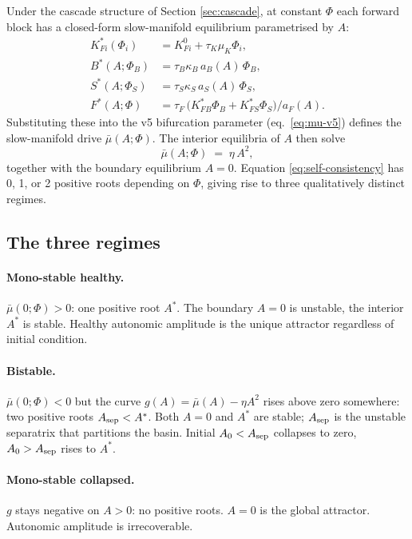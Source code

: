 \documentclass[11pt,a4paper]{article}
\theoremstyle{definition}
\begin{document}
Under the cascade structure of Section \ref{sec:cascade}, at constant
$\Phi$ each forward block has a closed-form slow-manifold equilibrium
parametrised by $A$:
\begin{align}
K_{Fi}^*(\Phi_i)   &= K_{Fi}^0 + \tau_K \mu_K \Phi_i, \\
B^*(A; \Phi_B)     &= \tau_B \kappa_B \, a_B(A) \, \Phi_B, \\
S^*(A; \Phi_S)     &= \tau_S \kappa_S \, a_S(A) \, \Phi_S, \\
F^*(A; \Phi)       &= \tau_F \, \big(K_{FB}^* \Phi_B + K_{FS}^* \Phi_S\big) / a_F(A).
\end{align}
Substituting these into the v5 bifurcation parameter (eq.\
\ref{eq:mu-v5}) defines the slow-manifold drive $\bar\mu(A; \Phi)$.
The interior equilibria of $A$ then solve
\begin{equation}
\bar\mu(A; \Phi) \;=\; \eta\, A^2,
\label{eq:self-consistency}
\end{equation}
together with the boundary equilibrium $A = 0$. Equation
\eqref{eq:self-consistency} has 0, 1, or 2 positive roots depending on
$\Phi$, giving rise to three qualitatively distinct regimes.

\subsection{The three regimes}

\paragraph{Mono-stable healthy.} $\bar\mu(0; \Phi) > 0$: one positive
root $A^*$. The boundary $A = 0$ is unstable, the interior $A^*$ is
stable. Healthy autonomic amplitude is the unique attractor regardless
of initial condition.

\paragraph{Bistable.} $\bar\mu(0; \Phi) < 0$ but the curve $g(A) =
\bar\mu(A) - \eta A^2$ rises above zero somewhere: two positive roots
$A_{\rm sep} < A^*$. Both $A = 0$ and $A^*$ are stable; $A_{\rm sep}$ is
the unstable separatrix that partitions the basin. Initial $A_0 <
A_{\rm sep}$ collapses to zero, $A_0 > A_{\rm sep}$ rises to $A^*$.

\paragraph{Mono-stable collapsed.} $g$ stays negative on $A > 0$: no
positive roots. $A = 0$ is the global attractor. Autonomic amplitude is
irrecoverable.
\end{document}
